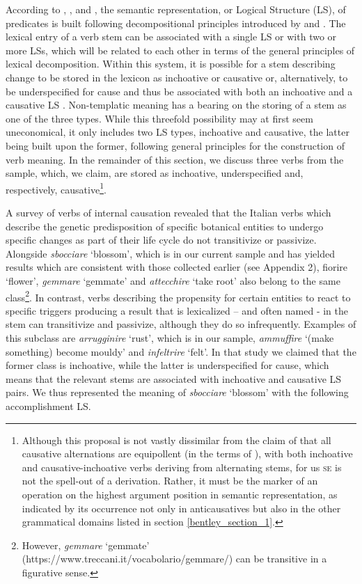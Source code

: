 \documentclass[output=paper,colorlinks,citecolor=brown
]{langscibook}
\begin{document}
According to \citet[82—129]{vanvalin1997syntax}, \citet[32—49]{vanvalin2005exploring}, and \citet[94—107]{vanvalin2023principles}, the semantic representation, or Logical Structure (LS), of predicates is built following decompositional principles introduced by \citet{vendler1967linguistics} and \citet{dowty1979word}. The lexical entry of a verb stem can be associated with a single LS or with two or more LSs, which will be related to each other in terms of the general principles of lexical decomposition. Within this system, it is possible for a stem describing change to be stored in the lexicon as inchoative or causative or, alternatively, to be underspecified for cause and thus be associated with both an inchoative and a causative LS \citep{brocher2017full}. Non-templatic meaning has a bearing on the storing of a stem as one of the three types. While this threefold possibility may at first seem uneconomical, it only includes two LS types, inchoative and causative, the latter being built upon the former, following general principles for the construction of verb meaning. In the remainder of this section, we discuss three verbs from the sample, which, we claim, are stored as inchoative, underspecified and, respectively, causative\footnote{Although this proposal is not vastly dissimilar from the claim of \citet{pinon2001finer} that all causative alternations are equipollent (in the terms of \cite{haspelmath1993more}), with both inchoative and causative-inchoative verbs deriving from alternating stems, for us \textsc{se} is not the spell-out of a derivation. Rather, it must be the marker of an operation on the highest argument position in semantic representation, as indicated by its occurrence not only in anticausatives but also in the other grammatical domains listed in section \ref{bentley_section_1}.}. 

A survey of verbs of internal causation \citep{bentley2023internally} revealed that the Italian verbs which describe the genetic predisposition of specific botanical entities to undergo specific changes as part of their life cycle do not transitivize or passivize. Alongside \textit{sbocciare} ‘blossom’, which is in our current sample and has yielded results which are consistent with those collected earlier (see Appendix 2), fiorire ‘flower’, \textit{gemmare} ‘gemmate’ and \textit{attecchire} ‘take root’ also belong to the same class\footnote{However, \textit{gemmare} ‘gemmate’ (https://www.treccani.it/vocabolario/gemmare/) can be transitive in a figurative sense.}.   In contrast, verbs describing the propensity for certain entities to react to specific triggers producing a result that is lexicalized – and often named - in the stem can transitivize and passivize, although they do so infrequently. Examples of this subclass are \textit{arrugginire} ‘rust’, which is in our sample, \textit{ammuffire} ‘(make something) become mouldy’ and \textit{infeltrire} ‘felt’. In that study we claimed that the former class is inchoative, while the latter is underspecified for cause, which means that the relevant stems are associated with inchoative and causative LS pairs. We thus represented the meaning of \textit{sbocciare} ‘blossom’ with the following accomplishment LS. 
\end{document}

